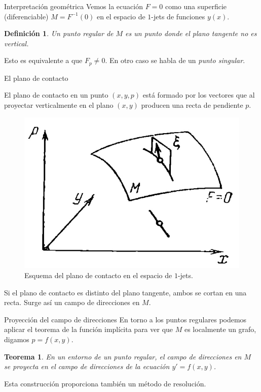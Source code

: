 \documentclass[10pt, spanish]{beamer}
\newtheorem{teorema}{Teorema}
\newtheorem{defi}{Definición}
\begin{document}
\begin{frame}{Interpretación geométrica}
  Vemos la ecuación $F=0$ como una superficie (diferenciable) $M=F^{-1}(0)$ en el espacio de $1$-jets de funciones $y(x)$.

\vspace{1em}
  \begin{defi}
    Un \textit{punto regular} de $M$ es un punto donde el plano tangente no es vertical.
  \end{defi}

  Esto es equivalente a que $F_p\neq 0$. En otro caso se habla de un \textit{punto singular}.

\end{frame}

\begin{frame}{El plano de contacto}

  El plano de contacto en un punto $(x,y,p)$ está formado por los vectores que al proyectar verticalmente en el plano $(x, y)$ producen una recta de pendiente $p$.
  \begin{figure}
	\centering
	\includegraphics[width=.4\textwidth]{../figures/jets}
	\caption{\footnotesize Esquema del plano de contacto en el espacio de $1$-jets.}
  \end{figure}
  Si el plano de contacto es distinto del plano tangente, ambos se cortan en una recta. Surge así un campo de direcciones en $M$.

\end{frame}

\begin{frame}{Proyección del campo de direcciones}
  En torno a los puntos regulares podemos aplicar el teorema de la función implícita para ver que $M$ es localmente un grafo, digamos $p=f(x,y)$.
  \vspace{1em}

\begin{teorema}
  En un entorno de un punto regular, el campo de direcciones en $M$ se proyecta en el campo de direcciones de la ecuación $y'=f(x,y)$.
\end{teorema}

  \vspace{1em}
  Esta construcción proporciona también un método de resolución.
\end{frame}
\end{document}
